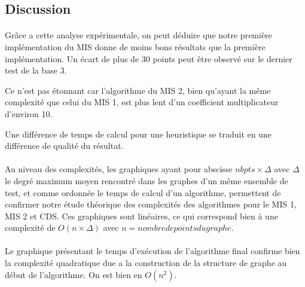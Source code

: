 \newpage
\subsection{Discussion}

\paragraph{}
Grâce a cette analyse expérimentale, on peut déduire que notre première implémentation du MIS donne de moins bons résultats que la première implémentation. Un écart de plus de 30 points peut être observé sur le dernier test de la base 3.

Ce n'est pas étonnant car l'algorithme du MIS 2, bien qu'ayant la même complexité que celui du MIS 1, est plus lent d'un coefficient multiplicateur d'environ 10.

Une différence de temps de calcul pour une heuristique se traduit en une différence de qualité du résultat.

\paragraph{}
Au niveau des complexités, les graphiques ayant pour abscisse $nbpts \times \Delta$ avec $\Delta$ le degré maximum moyen rencontré dans les graphes d'un même ensemble de test, et comme ordonnée le temps de calcul d'un algorithme, permettent de confirmer notre étude théorique des complexités des algorithmes pour le MIS 1, MIS 2 et CDS.
Ces graphiques sont linéaires, ce qui correspond bien à une complexité de $O(n \times \Delta)$ avec $n = nombre de points du graphe$.

\paragraph{}
Le graphique présentant le temps d'exécution de l'algorithme final confirme bien la complexité quadratique due a la construction de la structure de graphe au début de l'algorithme. On est bien en $O(n^2)$.
